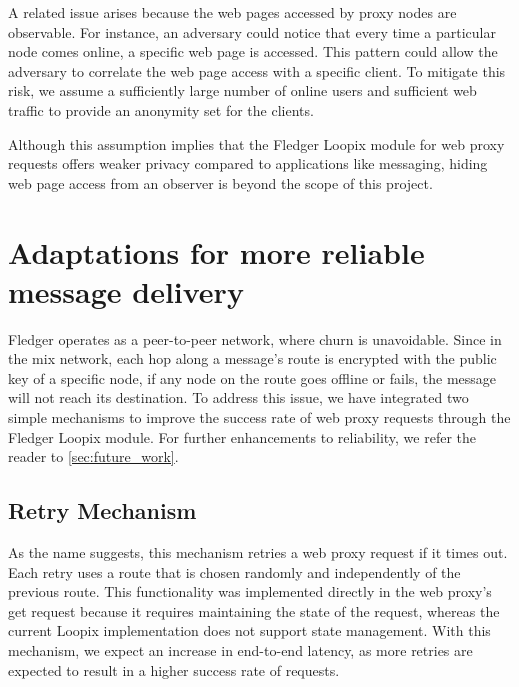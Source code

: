 \documentclass[a4paper,11pt,oneside]{report}
\begin{document}
A related issue arises because the web pages accessed by proxy nodes are observable. For instance, an adversary could notice that every time a particular node comes online, a specific web page is accessed. This pattern could allow the adversary to correlate the web page access with a specific client. To mitigate this risk, we assume a sufficiently large number of online users and sufficient web traffic to provide an anonymity set for the clients.

Although this assumption implies that the Fledger Loopix module for web proxy requests offers weaker privacy compared to applications like messaging, hiding web page access from an observer is beyond the scope of this project.


\section{Adaptations for more reliable message delivery}
\label{sec:design_reliability}

Fledger operates as a peer-to-peer network, where churn is unavoidable. Since in the mix network, each hop along a message’s route is encrypted with the public key of a specific node, if any node on the route goes offline or fails, the message will not reach its destination. To address this issue, we have integrated two simple mechanisms to improve the success rate of web proxy requests through the Fledger Loopix module. For further enhancements to reliability, we refer the reader to \autoref{sec:future_work}.

\subsection{Retry Mechanism}
As the name suggests, this mechanism retries a web proxy request if it times out. Each retry uses a route that is chosen randomly and independently of the previous route. This functionality was implemented directly in the web proxy's get request because it requires maintaining the state of the request, whereas the current Loopix implementation does not support state management. With this mechanism, we expect an increase in end-to-end latency, as more retries are expected to result in a higher success rate of requests.
\end{document}
